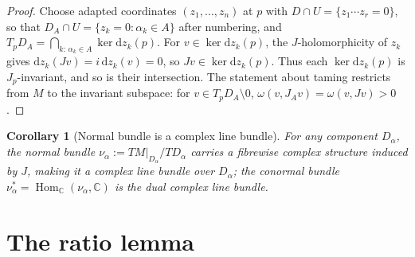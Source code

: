 \documentclass[11pt]{article}
\newtheorem{corollary}[theorem]{Corollary}
\theoremstyle{definition}
\theoremstyle{remark}
\newcommand{\CC}{\mathbb{C}}
\newcommand{\Hom}{\operatorname{Hom}}
\newcommand{\dd}{\mathrm{d}}
\begin{document}
\begin{proof}
Choose adapted coordinates $(z_1,\dots,z_n)$ at $p$ with
$D\cap U=\{z_1\cdots z_r=0\}$, so that $D_A\cap U=\{z_{k}=
0:\alpha_k\in A\}$ after numbering, and
$T_pD_A=\bigcap_{k:\,\alpha_k\in A}\ker\dd z_k(p)$. For
$v\in\ker\dd z_k(p)$, the $J$-holomorphicity of $z_k$ gives
$\dd z_k(Jv)=i\,\dd z_k(v)=0$, so $Jv\in\ker\dd z_k(p)$. Thus each
$\ker\dd z_k(p)$ is $J_p$-invariant, and so is their intersection.
The statement about taming restricts from $M$ to the invariant
subspace: for $v\in T_pD_A\setminus0$,
$\omega(v,J_Av)=\omega(v,Jv)>0$.
\end{proof}

\begin{corollary}[Normal bundle is a complex line bundle]
\label{cor:normal}
For any component $D_\alpha$, the normal bundle
$\nu_\alpha:=TM|_{D_\alpha}/TD_\alpha$ carries a fibrewise complex
structure induced by $J$, making it a complex line bundle over
$D_\alpha$; the conormal bundle $\nu_\alpha^*=\Hom_\CC(\nu_\alpha,
\CC)$ is the dual complex line bundle.
\end{corollary}


\section{The ratio lemma}\label{sec:ratio}
\end{document}
